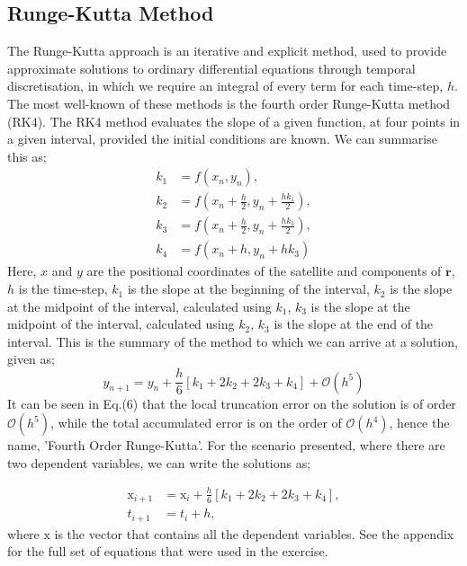 \documentclass[twocolumn, prl, nobalancelastpage, aps, citeautoscript, longbibliography, 10pt]{revtex4-1}
\begin{document}
\subsection{Runge-Kutta Method}
The Runge-Kutta approach is an iterative and explicit method, used to provide approximate solutions to ordinary differential equations through temporal discretisation, in which 
we require an integral of every term for each time-step, $h$. The most well-known of these methods is the fourth order Runge-Kutta method (RK4). The RK4 method evaluates the slope
of a given function, at four points in a given interval, provided the initial conditions are known. We can summarise this as;
\begin{align}
k_1 &= f(x_n, y_n), \\
k_2 &= f(x_n + \frac{h}{2}, y_n + \frac{hk_1}{2}), \\
k_3 &= f(x_n + \frac{h}{2}, y_n + \frac{hk_1}{2}), \\
k_4 &= f(x_n + h, y_n + hk_3)
\end{align}
Here, $x$ and $y$ are the positional coordinates of the satellite and components of $\bm{r}$, $h$ is the time-step, $k_1$ is the slope at the beginning of the interval, $k_2$
is the slope at the midpoint of the interval, calculated using $k_1$, $k_3$ is the slope at the midpoint of the interval, calculated using $k_2$, $k_3$ is the slope at the end of the 
interval. This is the summary of the method to which we can arrive at a solution, given as;
\begin{equation}
    y_{n+1} = y_n + \frac{h}{6}\left[k_1 + 2k_2 + 2k_3 + k_4\right] +\mathcal{O}(h^5)
\end{equation}
It can be seen in Eq.(6) that the local truncation error on the solution is of order $\mathcal{O}(h^5)$, while the total accumulated error is on the order of $\mathcal{O}(h^4)$, 
hence the name, 'Fourth Order Runge-Kutta'. For the scenario presented, where there are two dependent variables, we can write the solutions as;

\begin{align}
    \bm{\mathrm{x}}_{i+1}& = \bm{\mathrm{x}}_i + \frac{h}{6}\left[k_1 + 2k_2 + 2k_3 + k_4\right],\\
    t_{i+1}& = t_i + h,
\end{align}
where $\bm{\mathrm{x}}$ is the vector that contains all the dependent variables. See the appendix for the full set of equations that were used in the exercise. 
\end{document}
